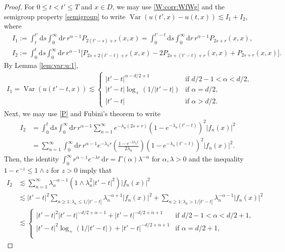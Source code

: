 \documentclass[reqno]{amsart}
\DeclareMathOperator{\Var}{Var}
\renewcommand{\d}{\mathrm d}
\newcommand{\1}{\mathbf 1}
\numberwithin{equation}{section}
\theoremstyle{definition}
\begin{document}
\begin{proof}
For $0\le t < t' \le T$ and $x \in D$, we may use \eqref{W:corr:WfWg} and the semigroup property \eqref{semigroup} to write $\Var(u(t',x)-u(t,x))\lesssim I_1+I_2$, where
\begin{align*}
	& I_1:=\int_t^{t'}\d s\int_0^\infty\d r\,
    r^{\alpha-1}P_{2(t'-s)+r}(x,x) = \int_0^{t'-t} \d s \int_0^\infty \d r \, r^{\alpha-1} P_{2s+r}(x,x),\\
	&I_2:=\int_0^t \d s \int_0^\infty \d r\, r^{\alpha-1} \big[P_{2s+2(t'-t)+r}(x,x)-2P_{2s+(t'-t)+r}(x,x) 
        +P_{2s+r}(x,x) \big].
\end{align*}
By Lemma \ref{lem:var:u:1},
\begin{align}\label{var:u-u:t:I1}
	I_1 = \Var(u(t'-t, x)) \lesssim 
	\begin{cases}
	|t'-t|^{\alpha-d/2+1} & \text{if $d/2-1<\alpha<d/2$,}\\
	|t'-t| \log_+(1/|t'-t|) & \text{if $\alpha=d/2$,}\\
	|t'-t| & \text{if $\alpha>d/2$.}
	\end{cases}
\end{align}
Next, we may use \eqref{P} and Fubini's theorem to write
\begin{align*}
	I_2 &= \int_0^t \d s \int_0^\infty \d r \, r^{\alpha-1} \sum_{n=1}^\infty e^{-\lambda_n(2s+r)} \left( 1 - e^{-\lambda_n(t'-t)} \right)^2 |f_n(x)|^2\\
	& = \sum_{n=1}^\infty \int_0^\infty \d r \, r^{\alpha-1} e^{-\lambda_n r} \left( \frac{1-e^{-2\lambda_n t}}{2\lambda_n} \right) \left( 1 - e^{-\lambda_n(t'-t)} \right)^2 |f_n(x)|^2.
\end{align*}
Then, the identity $\int_0^\infty r^{\alpha-1} e^{-\lambda r} \, \d r = \Gamma(\alpha) \lambda^{-\alpha}$ for $\alpha,\lambda>0$ and the inequality $1-e^{-z} \le 1 \wedge z$ for $z>0$ imply that
\begin{align*}
	I_2 &\lesssim \sum_{n=1}^\infty \lambda_n^{-\alpha-1} \left( 1 \wedge \lambda_n^2|t'-t|^2 \right) |f_n(x)|^2\\
	&\lesssim |t'-t|^2 \sum_{n \ge 1: \lambda_n \le 1/|t'-t|} \lambda_n^{-\alpha+1} |f_n(x)|^2 + \sum_{n \ge 1: \lambda_n > 1/|t'-t|} \lambda_n^{-\alpha-1} |f_n(x)|^2\\
	& \lesssim \begin{cases}
	|t'-t|^2 |t'-t|^{-d/2+\alpha-1} + |t'-t|^{-d/2+\alpha+1} & \text{if $d/2-1<\alpha<d/2+1$,}\\
	|t'-t|^2 \log_+(1/|t'-t|) + |t'-t|^{-d/2+\alpha+1} & \text{if $\alpha=d/2+1$,}\\

\end{cases}
\end{align*}
\end{proof}
\end{document}

